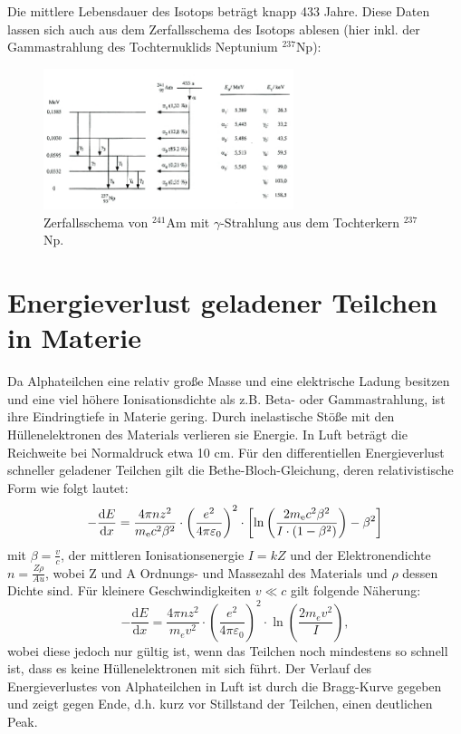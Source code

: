 \documentclass[bigchapter,colorback,accentcolor=tud4b,linedtoc,11pt]{tudreport}
\begin{document}
Die mittlere Lebensdauer des Isotops beträgt knapp 433 Jahre. Diese Daten lassen sich auch aus dem Zerfallsschema des Isotops ablesen (hier inkl. der Gammastrahlung des Tochternuklids Neptunium $^{237}$Np):

\begin{figure}[H] 
  \centering
     \includegraphics[width=0.65\textwidth]{img/schema.jpg}
  \caption{Zerfallsschema von $^{241}$Am mit $\gamma$-Strahlung aus dem Tochterkern $^{237}$Np. \cite{website}}
  \label{fig:Bild1}
\end{figure}

\section{Energieverlust geladener Teilchen in Materie}

Da Alphateilchen eine relativ große Masse und eine elektrische Ladung besitzen und eine viel höhere Ionisationsdichte als z.B. Beta- oder Gammastrahlung, ist ihre Eindringtiefe in Materie gering. Durch inelastische Stöße mit den Hüllenelektronen des Materials verlieren sie Energie. In Luft beträgt die Reichweite bei Normaldruck etwa 10 cm. Für den differentiellen Energieverlust schneller geladener Teilchen gilt die Bethe-Bloch-Gleichung, deren relativistische Form wie folgt lautet:
$$ - \frac{\mathrm{d}E}{\mathrm{d}x} = \frac{4 \pi nz^2}{m_{\rm e} c^2 \beta^2 } \cdot \left(\frac{e^2}{4\pi\varepsilon_0}\right)^2 \cdot \left[\ln \left(\frac{2m_{\rm e} c^2 \beta^2}{I \cdot (1-\beta^2)}\right) - \beta^2\right]$$
mit $\beta = \frac{v}{c}$, der mittleren Ionisationsenergie $I = kZ$ und der Elektronendichte $n = \frac{Z \rho}{A u}$, wobei Z und A Ordnungs- und Massezahl des Materials und $\rho$ dessen Dichte sind.
Für kleinere Geschwindigkeiten $v \ll c$ gilt folgende Näherung: 
$$- \frac{\mathrm{d}E}{\mathrm{d}x} = \frac{4 \pi nz^2}{m_e v^2}
\cdot \left(\frac{e^2}{4\pi\varepsilon_0}\right)^2
\cdot \ln \left(\frac{2m_e v^2 }{I}\right),$$
wobei diese jedoch nur gültig ist, wenn das Teilchen noch mindestens so schnell ist, dass es keine Hüllenelektronen mit sich führt.
Der Verlauf des Energieverlustes von Alphateilchen in Luft ist durch die Bragg-Kurve gegeben und zeigt gegen Ende, d.h. kurz vor Stillstand der Teilchen, einen deutlichen Peak.
\end{document}
